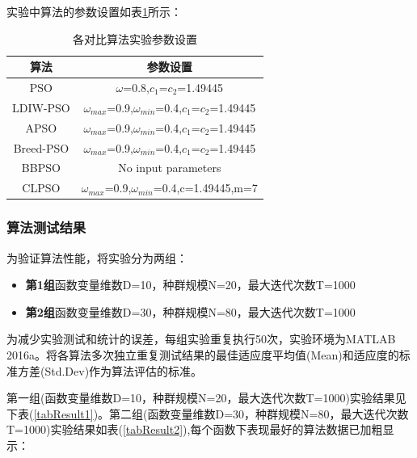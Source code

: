 实验中算法的参数设置如表\ref{tabAlgVar}所示：

\begin{table}[H]
	\renewcommand\arraystretch{1.1}
	\centering

	\caption{各对比算法实验参数设置}
	\label{tabAlgVar}
	\begin{tabular}{cc}
		\toprule[1.5pt]
		\textbf{算法} & \textbf{参数设置} \\
		\midrule[1pt]

		PSO   & $\omega$=0.8,$ c_1 $=$ c_2 $=1.49445 \\
		LDIW-PSO & $\omega_{max}$=0.9,$\omega_{min}$=0.4,$ c_1 $=$ c_2 $=1.49445 \\
		APSO  & $\omega_{max}$=0.9,$\omega_{min}$=0.4,$ c_1 $=$ c_2 $=1.49445 \\
		Breed-PSO & $\omega_{max}$=0.9,$\omega_{min}$=0.4,$ c_1 $=$ c_2 $=1.49445 \\
		BBPSO & No input parameters \\
		CLPSO & $\omega_{max}$=0.9,$\omega_{min}$=0.4,c=1.49445,m=7 \\
		\bottomrule[1.5pt]
	\end{tabular}%

\end{table}%

\subsubsection{算法测试结果}
为验证算法性能，将实验分为两组：
\begin{itemize}
	\item \textbf{第1组}函数变量维数D=10，种群规模N=20，最大迭代次数T=1000
	\item \textbf{第2组}函数变量维数D=30，种群规模N=80，最大迭代次数T=1000
\end{itemize}

为减少实验测试和统计的误差，每组实验重复执行50次，实验环境为MATLAB 2016a。将各算法多次独立重复测试结果的最佳适应度平均值(Mean)和适应度的标准方差(Std.Dev)作为算法评估的标准。

第一组(函数变量维数D=10，种群规模N=20，最大迭代次数T=1000)实验结果见下表(\ref{tabResult1})。第二组(函数变量维数D=30，种群规模N=80，最大迭代次数T=1000)实验结果如表(\ref{tabResult2}),每个函数下表现最好的算法数据已加粗显示：



